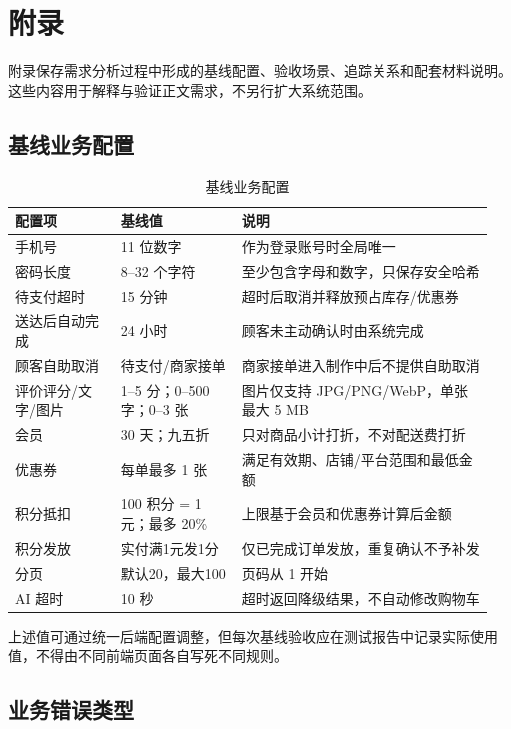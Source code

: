 \section{附录}

附录保存需求分析过程中形成的基线配置、验收场景、追踪关系和配套材料说明。这些内容用于解释与验证正文需求，不另行扩大系统范围。

\subsection{基线业务配置}

\begin{longtable}{|L{0.21\linewidth}|L{0.24\linewidth}|L{0.50\linewidth}|}
\caption{基线业务配置}\label{tab:baseline-config}\\ \hline
\textbf{配置项} & \textbf{基线值} & \textbf{说明} \\ \hline
手机号 & 11 位数字 & 作为登录账号时全局唯一 \\ \hline
密码长度 & 8--32 个字符 & 至少包含字母和数字，只保存安全哈希 \\ \hline
待支付超时 & 15 分钟 & 超时后取消并释放预占库存/优惠券 \\ \hline
送达后自动完成 & 24 小时 & 顾客未主动确认时由系统完成 \\ \hline
顾客自助取消 & 待支付/商家接单 & 商家接单进入制作中后不提供自助取消 \\ \hline
评价评分/文字/图片 & 1--5 分；0--500 字；0--3 张 & 图片仅支持 JPG/PNG/WebP，单张最大 5 MB \\ \hline
会员 & 30 天；九五折 & 只对商品小计打折，不对配送费打折 \\ \hline
优惠券 & 每单最多 1 张 & 满足有效期、店铺/平台范围和最低金额 \\ \hline
积分抵扣 & 100 积分 = 1 元；最多 20\% & 上限基于会员和优惠券计算后金额 \\ \hline
积分发放 & 实付满1元发1分 & 仅已完成订单发放，重复确认不予补发 \\ \hline
分页 & 默认20，最大100 & 页码从 1 开始 \\ \hline
AI 超时 & 10 秒 & 超时返回降级结果，不自动修改购物车 \\ \hline
\end{longtable}

上述值可通过统一后端配置调整，但每次基线验收应在测试报告中记录实际使用值，不得由不同前端页面各自写死不同规则。

\subsection{业务错误类型}

